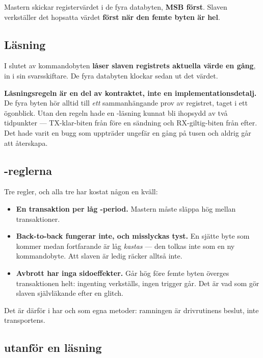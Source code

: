 Mastern skickar registervärdet i de fyra databyten, \textbf{MSB först}. Slaven verkställer det
hopsatta värdet \textbf{först när den femte byten är hel}.

\subsection{Läsning}

I slutet av kommandobyten \textbf{låser slaven registrets aktuella värde en gång}, in i sin
svarsskiftare. De fyra databyten klockar sedan ut det värdet.

\textbf{Låsningsregeln är en del av kontraktet, inte en implementationsdetalj.} De fyra byten hör
alltid till \emph{ett} sammanhängande prov av registret, taget i ett ögonblick. Utan den regeln
hade en -läsning kunnat bli ihopsydd av två tidpunkter --- TX-klar-biten från före en
sändning och RX-giltig-biten från efter. Det hade varit en bugg som uppträder ungefär en gång på
tusen och aldrig går att återskapa.

\subsection{\texorpdfstring{}{SS}-reglerna}

Tre regler, och alla tre har kostat någon en kväll:

\begin{itemize}
  \item \textbf{En transaktion per låg -period.} Mastern måste släppa  hög
    mellan transaktioner.
  \item \textbf{Back-to-back fungerar inte, och misslyckas tyst.} En sjätte byte som kommer medan
     fortfarande är låg \emph{kastas} --- den tolkas inte som en ny kommandobyte. Att
    slaven är ledig räcker alltså inte.
  \item \textbf{Avbrott har inga sidoeffekter.} Går  hög före femte byten överges
    transaktionen helt: ingenting verkställs, ingen trigger går. Det är vad som gör slaven
    självläkande efter en glitch.
\end{itemize}

Det är därför  i  har  och 
som egna metoder: ramningen är drivrutinens beslut, inte transportens.

\subsection{\texorpdfstring{}{MISO} utanför en läsning}

